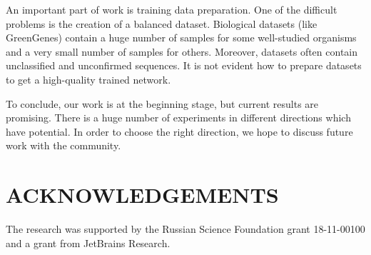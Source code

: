 \documentclass[a4paper,twoside]{article}
\begin{document}
An important part of work is training data preparation.
One of the difficult problems is the creation of a balanced dataset.
Biological datasets (like GreenGenes) contain a huge number of samples for some well-studied organisms and a very small number of samples for others.
Moreover, datasets often contain unclassified and unconfirmed sequences.
It is not evident how to prepare datasets to get a high-quality trained network.

To conclude, our work is at the beginning stage, but current results are promising. 
There is a huge number of experiments in different directions which have potential.
In order to choose the right direction, we hope to discuss future work with the community.


\section*{\uppercase{Acknowledgements}}

\noindent The research was supported by the Russian Science Foundation grant 18-11-00100 and a grant from JetBrains Research.


\vfill


{\small
}


\vfill
\end{document}
